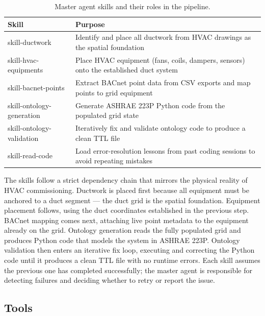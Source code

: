 \begin{table}[htbp]
  \caption{Master agent skills and their roles in the pipeline.}
  \label{tab:skills}
  \centering
  \begin{tabular}{ll}
    \toprule
    \textbf{Skill} & \textbf{Purpose} \\
    \midrule
    skill-ductwork            & Identify and place all ductwork from HVAC drawings as the spatial foundation \\
    skill-hvac-equipments     & Place HVAC equipment (fans, coils, dampers, sensors) onto the established duct system \\
    skill-bacnet-points       & Extract BACnet point data from CSV exports and map points to grid equipment \\
    skill-ontology-generation & Generate ASHRAE 223P Python code from the populated grid state \\
    skill-ontology-validation & Iteratively fix and validate ontology code to produce a clean TTL file \\
    skill-read-code           & Load error-resolution lessons from past coding sessions to avoid repeating mistakes \\
    \bottomrule
  \end{tabular}
\end{table}

The skills follow a strict dependency chain that mirrors the physical reality of HVAC
commissioning. Ductwork is placed first because all equipment must be anchored to a duct
segment --- the duct grid is the spatial foundation. Equipment placement follows, using
the duct coordinates established in the previous step. BACnet mapping comes next, attaching
live point metadata to the equipment already on the grid. Ontology generation reads the
fully populated grid and produces Python code that models the system in ASHRAE 223P.
Ontology validation then enters an iterative fix loop, executing and correcting the Python
code until it produces a clean TTL file with no runtime errors. Each skill assumes the
previous one has completed successfully; the master agent is responsible for detecting
failures and deciding whether to retry or report the issue.

\subsection{Tools}

